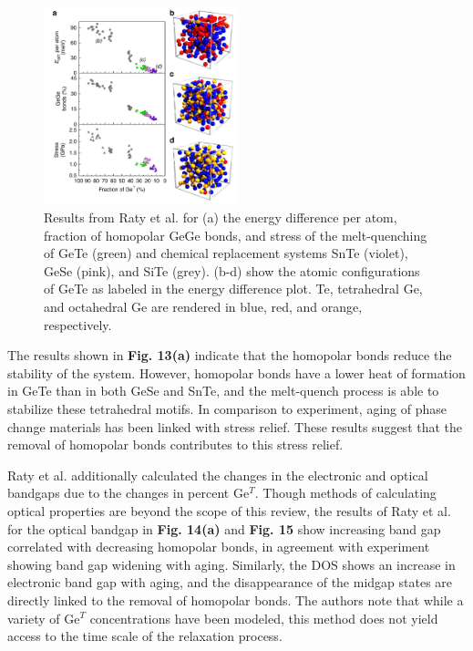 \documentclass[3p,review,12pt]{elsarticle}
\begin{document}
\begin{figure}[h]
	\includegraphics[width=0.5\textwidth]{raty1}
	\centering
	\caption{Results from Raty et al. \cite{Raty2015} for (a) the energy difference per atom, fraction of homopolar GeGe bonds, and stress of the melt-quenching of GeTe (green) and chemical replacement systems SnTe (violet), GeSe (pink), and SiTe (grey). (b-d) show the atomic configurations of GeTe as labeled in the energy difference plot. Te, tetrahedral Ge, and octahedral Ge are rendered in blue, red, and orange, respectively.} 
\end{figure}
\par 
The results shown in \textbf{Fig. 13(a)} indicate that the homopolar bonds reduce the stability of the system. However, homopolar bonds have a lower heat of formation in GeTe than in both GeSe and SnTe, and the melt-quench process is able to stabilize these tetrahedral motifs. In comparison to experiment, aging of phase change materials has been linked with stress relief. These results suggest that the removal of homopolar bonds contributes to this stress relief.
\par 
Raty et al. additionally calculated the changes in the electronic and optical bandgaps due to the changes in percent Ge$^{T}$. Though methods of calculating optical properties are beyond the scope of this review, the results of Raty et al. for the optical bandgap in \textbf{Fig. 14(a)} and \textbf{Fig. 15} show increasing band gap correlated with decreasing homopolar bonds, in agreement with experiment showing band gap widening with aging. Similarly, the DOS shows an increase in electronic band gap with aging, and the disappearance of the midgap states are directly linked to the removal of homopolar bonds. The authors note that while a variety of Ge$^T$ concentrations have been modeled, this method does not yield access to the time scale of the relaxation process. 
\end{document}
